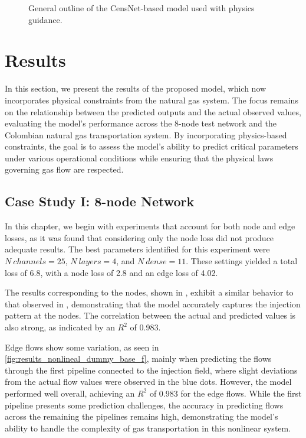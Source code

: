 \begin{figure}[h]
    \centering
    \setlength{}        
    \setlength{}
    \resizebox{\figurewidth}{\figureheight}{}
    \caption{General outline of the CensNet-based model used with physics guidance.}
        \label{fig:nonlineal_model_description}
\end{figure}

\section{Results}


In this section, we present the results of the proposed model, which now incorporates physical constraints from the natural gas system. The focus remains on the relationship between the predicted outputs and the actual observed values, evaluating the model's performance across the 8-node test network and the Colombian natural gas transportation system. By incorporating physics-based constraints, the goal is to assess the model's ability to predict critical parameters under various operational conditions while ensuring that the physical laws governing gas flow are respected.

\subsection{Case Study I: 8-node Network}



In this chapter, we begin with experiments that account for both node and edge losses, as it was found that considering only the node loss did not produce adequate results. The best parameters identified for this experiment were $N \ channels=25$, $N \ layers =4$, and $N \ dense = 11$. These settings yielded a total loss of 6.8, with a node loss of 2.8 and an edge loss of 4.02.

The results corresponding to the nodes, shown in , exhibit a similar behavior to that observed in 
, demonstrating that the model accurately captures the injection pattern at the nodes. The correlation between the actual and predicted values is also strong, as indicated by an $R^2$ of 0.983.

Edge flows show some variation, as seen in \cref{fig:results_nonlineal_dummy_base_f}, mainly when predicting the flows through the first pipeline connected to the injection field, where slight deviations from the actual flow values were observed in the blue dots. However, the model performed well overall, achieving an $R^2$ of 0.983 for the edge flows. While the first pipeline presents some prediction challenges, the accuracy in predicting flows across the remaining the pipelines remains high, demonstrating the model's ability to handle the complexity of gas transportation in this nonlinear system.


